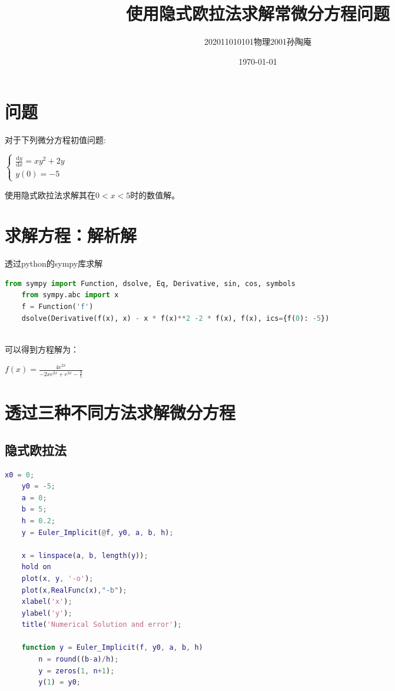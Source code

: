 \documentclass[12pt, a4paper, oneside]{ctexart}
\title{使用隐式欧拉法求解常微分方程问题}
\date{\today}
\author{202011010101物理2001孙陶庵}
\begin{document}
\begin{spacing}{2.0}
\tableofcontents
\maketitle

\section{问题}
对于下列微分方程初值问题:
\begin{center}
$    \left\{\begin{matrix} 
        \frac{\mathrm{d}y}{\mathrm{d}x}=xy^2+2y \\  
        y(0)=-5 
      \end{matrix}\right. $
\end{center}
使用隐式欧拉法求解其在$0<x<5$时的数值解。
\section{求解方程：解析解}
透过python的sympy库求解
\begin{lstlisting}[language=Python, caption=0.1s]
    from sympy import Function, dsolve, Eq, Derivative, sin, cos, symbols
    from sympy.abc import x
    f = Function('f')
    dsolve(Derivative(f(x), x) - x * f(x)**2 -2 * f(x), f(x), ics={f(0): -5})
    
\end{lstlisting}
可以得到方程解为：
\begin{center}
    $f{\left(x \right)} = \frac{4 e^{2 x}}{- 2 x e^{2 x} + e^{2 x} - \frac{9}{5}}$
\end{center}
\section{透过三种不同方法求解微分方程}
\subsection{隐式欧拉法}
\begin{lstlisting}[language=MATLAB, caption=隐式欧拉法]
    x0 = 0;
    y0 = -5;
    a = 0;
    b = 5;
    h = 0.2;
    y = Euler_Implicit(@f, y0, a, b, h);
    
    x = linspace(a, b, length(y));
    hold on
    plot(x, y, '-o');
    plot(x,RealFunc(x),"-b");
    xlabel('x');
    ylabel('y');
    title('Numerical Solution and error');

    function y = Euler_Implicit(f, y0, a, b, h)
        n = round((b-a)/h);
        y = zeros(1, n+1);
        y(1) = y0;
        

\end{lstlisting}
\end{spacing}
\end{document}
